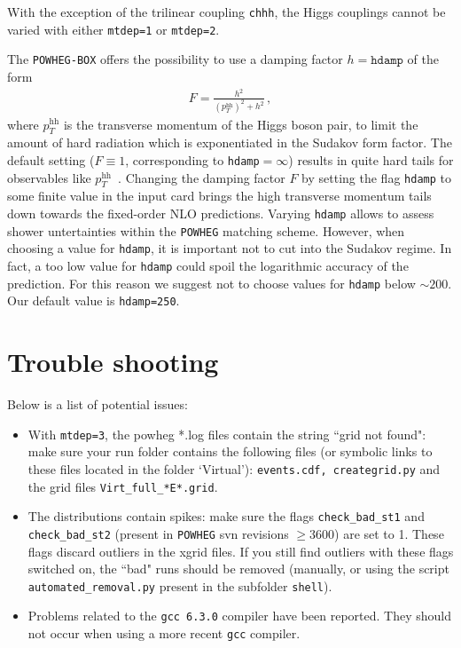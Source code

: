 \documentclass[paper]{JHEP3}
\newcommand\POWHEG{{\tt POWHEG}}
\newcommand\POWHEGBOX{{\tt POWHEG-BOX}}
\newcommand\pthh{\ensuremath{p_{T}^{\mathrm{hh}}}\xspace}
\begin{document}
With the exception of the trilinear coupling {\tt chhh}, the Higgs couplings cannot be varied with either {\tt mtdep=1} or {\tt mtdep=2}.

The \POWHEGBOX{} offers the possibility to use a damping factor $h=\texttt{hdamp}$ of the
form~\cite{Alioli:2008tz,Alioli:2009je}
\begin{align}
  F=\frac{h^{2}}{(\pthh)^2+h^{2}}\,,
\end{align}
where \pthh is the transverse momentum of the Higgs boson pair, to
limit the amount of hard radiation which is exponentiated in the
Sudakov form factor. The default setting ($F\equiv1$, corresponding to {\tt hdamp}$=\infty$) results in
quite hard tails for observables like
$\pthh$~\cite{Heinrich:2017kxx}. Changing the damping factor $F$ by
setting the flag {\tt hdamp} to some finite value in the input
card brings the high transverse momentum tails down towards the fixed-order NLO
predictions. Varying {\tt hdamp} allows to assess shower untertainties
within the \POWHEG{} matching scheme. However, when choosing a value
for {\tt hdamp}, it is important not to cut into the Sudakov
regime. In fact, a too low value for {\tt hdamp} could spoil the
logarithmic accuracy of the prediction. For this reason we suggest not
to choose values for {\tt hdamp} below $\sim 200$. Our default value is  {\tt hdamp=250}.

\section{Trouble shooting}

Below is a list of potential issues:

\begin{itemize}
\item With {\tt mtdep=3}, the powheg *.log files contain the string ``grid not found": make sure your run folder contains the following files 
(or symbolic links to these files located in the folder `Virtual'): {\tt events.cdf, creategrid.py} and the grid files  {\tt Virt\_full\_*E*.grid}.
\item The distributions contain spikes: make sure the flags {\tt check\_bad\_st1} and {\tt check\_bad\_st2} (present in \POWHEG{} svn revisions $\geq 3600$) are set to 1. These flags discard outliers in the xgrid files. If you still find outliers with these flags switched on, the ``bad" runs should be removed 
(manually, or using the script {\tt automated\_removal.py} present in the subfolder {\tt shell}).
\item Problems related to the {\tt gcc 6.3.0} compiler have been reported. They should not occur when using a more recent {\tt gcc} compiler.
\end{itemize}
\end{document}

